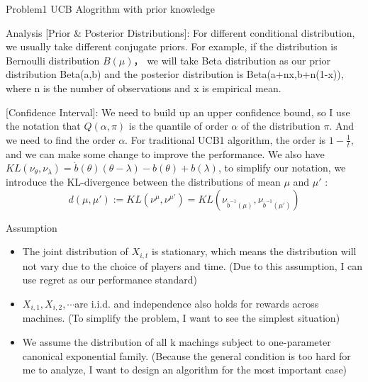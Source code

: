 \documentclass[letterpaper,12pt]{article}
\begin{document}
\begin{section}{Problem1 UCB Alogrithm with prior knowledge}
\begin{subsection}{Analysis}
        [Prior \&  Posterior Distributions]:
        For different conditional distribution, we usually take different conjugate priors. For example, if the distribution is Bernoulli distribution $B(\mu)$， we will take Beta distribution as our prior distribution Beta(a,b) and the posterior distribution is Beta(a+nx,b+n(1-x)), where n is the number of observations and x is empirical mean.\\ \par

        [Confidence Interval]:
        We need to build up an upper confidence bound, so I use the notation that $Q(\alpha,\pi)$ is the quantile of order $\alpha$ of the distribution $\pi$. And we need to find the order $\alpha$. For traditional UCB1 algorithm, the order is $1-\frac{1}{t}$, and we can make some change to improve the performance. We also have $KL(\nu_\theta,\nu_\lambda)=\dot b(\theta)(\theta-\lambda)-b(\theta)+b(\lambda)$, to simplify our notation, we introduce the KL-divergence between the distributions of mean $\mu$ and $\mu'$ : $$d(\mu,\mu'):=KL(\nu^\mu,\nu^{\mu'})=KL(\nu_{\dot b^{-1}(\mu)},\nu_{\dot b^{-1}(\mu')})$$


    \end{subsection}


    \begin{subsection}{Assumption}
        \begin{itemize}
          \item The joint distribution of $X_{i,t}$ is stationary, which means the distribution will not vary due to the choice of players and time. (Due to this assumption, I can use regret as our performance standard)
          \item  $X_{i,1},X_{i,2},\cdots$are i.i.d. and independence also holds for rewards across machines. (To simplify the problem, I want to see the simplest situation)
          \item We assume the distribution of all k machings subject to one-parameter canonical exponential family.  (Because the general condition is too hard for me to analyze, I want to design an algorithm for the most important case)
        \end{itemize}
    
    \end{subsection}


\end{section}
\end{document}
